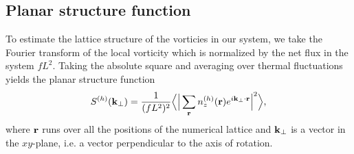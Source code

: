 \subsection{Planar structure function}

To estimate the lattice structure of the vorticies in our system, we take the Fourier transform of the local vorticity
which is normalized by the net flux in the system $fL^2$.
Taking the absolute square and averaging over thermal fluctuations yields the planar structure function \cite{Smorgrav05}
\begin{equation}
  S^{(h)}({\boldsymbol{\mathbf{k}}}_\perp) = \frac{1}{(fL^2)^2}\Big\langle\Big|\sum_{\boldsymbol{\mathbf{r}}}n_z^{(h)}({\boldsymbol{\mathbf{r}}})e^{i{\boldsymbol{\mathbf{k}}}_\perp\cdot{\ensuremath{\boldsymbol{\mathbf{r}}}}}\Big|^2\Big\rangle,
  \label{eq:obs:plan:planarStructFunc}
\end{equation}
where ${\boldsymbol{\mathbf{r}}}$ runs over all the positions of the numerical lattice and ${\boldsymbol{\mathbf{k}}}_\perp$ is a vector in the $xy$-plane, i.e. a vector
perpendicular to the axis of rotation.

